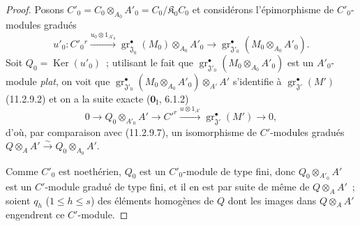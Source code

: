 \begin{proof}
Posons $C'_0=C_0\otimes_{A_0}A'_0=C_0/\mathfrak K_0C_0$ et considérons
l'épimorphisme de $C'_0$-modules gradués
\[
u'_0:C'_0{}^{r}\xrightarrow{u_0\otimes1_{A'_0}}
\operatorname{gr}_{\mathfrak J_0}^\bullet(M_0)\otimes_{A_0}A'_0
\longrightarrow
\operatorname{gr}_{\mathfrak J'_0}^\bullet(M_0\otimes_{A_0}A'_0).
\]
Soit $Q_0=\operatorname{Ker}(u'_0)$~; utilisant le fait que
$\operatorname{gr}_{\mathfrak J'_0}^\bullet(M_0\otimes_{A_0}A'_0)$ est un
$A'_0$-module \emph{plat}, on voit que $\operatorname{gr}_{\mathfrak J'_0}^\bullet(M_0\otimes_{A_0}A'_0)\otimes_{A'}A'$
s'identifie à $\operatorname{gr}_{\mathfrak J'}^\bullet(M')$ (11.2.9.2) et on a la
suite exacte ($\mathbf 0_{\mathrm I}$, 6.1.2)
\begin{equation}
0\longrightarrow Q_0\otimes_{A'_0}A'\longrightarrow C'^{r}
\xrightarrow{u\otimes1_{A'}}\operatorname{gr}_{\mathfrak J'}^\bullet(M')
\longrightarrow0,
\label{IV.11.2.9.8-fr}
\tag{11.2.9.8}
\end{equation}
d'où, par comparaison avec (11.2.9.7), un isomorphisme de $C'$-modules
gradués
$Q\otimes_AA'\xrightarrow{\sim}Q_0\otimes_{A_0}A'$.

Comme $C'_0$ est noethérien, $Q_0$ est un $C'_0$-module de type fini, donc
$Q_0\otimes_{A'_0}A'$ est un $C'$-module gradué de type fini, et il en est par
suite de même de $Q\otimes_AA'$~; soient $q_h$ ($1\leq h\leq s$) des éléments
homogènes de $Q$ dont les images dans $Q\otimes_AA'$ engendrent ce
$C'$-module.


\end{proof}
